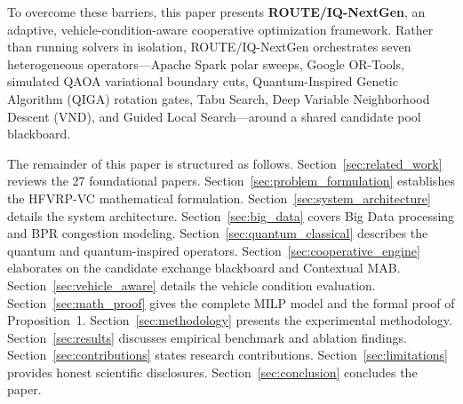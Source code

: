 To overcome these barriers, this paper presents \textbf{ROUTE/IQ-NextGen}, an adaptive, vehicle-condition-aware cooperative optimization framework. Rather than running solvers in isolation, ROUTE/IQ-NextGen orchestrates seven heterogeneous operators---Apache Spark polar sweeps, Google OR-Tools, simulated QAOA variational boundary cuts, Quantum-Inspired Genetic Algorithm (QIGA) rotation gates, Tabu Search, Deep Variable Neighborhood Descent (VND), and Guided Local Search---around a shared candidate pool blackboard.

The remainder of this paper is structured as follows. Section~\ref{sec:related_work} reviews the 27 foundational papers. Section~\ref{sec:problem_formulation} establishes the HFVRP-VC mathematical formulation. Section~\ref{sec:system_architecture} details the system architecture. Section~\ref{sec:big_data} covers Big Data processing and BPR congestion modeling. Section~\ref{sec:quantum_classical} describes the quantum and quantum-inspired operators. Section~\ref{sec:cooperative_engine} elaborates on the candidate exchange blackboard and Contextual MAB. Section~\ref{sec:vehicle_aware} details the vehicle condition evaluation. Section~\ref{sec:math_proof} gives the complete MILP model and the formal proof of Proposition~1. Section~\ref{sec:methodology} presents the experimental methodology. Section~\ref{sec:results} discusses empirical benchmark and ablation findings. Section~\ref{sec:contributions} states research contributions. Section~\ref{sec:limitations} provides honest scientific disclosures. Section~\ref{sec:conclusion} concludes the paper.
